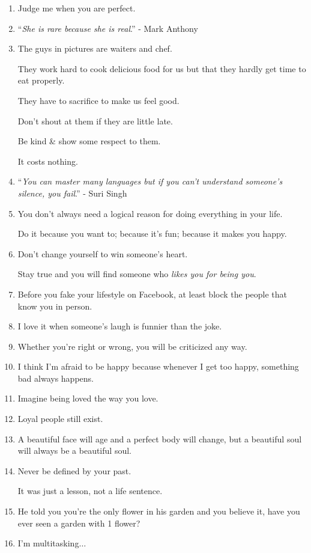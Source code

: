\documentclass{article}
\numberwithin{equation}{section}
\begin{document}
\begin{enumerate}
    Just lessons learned.
    \item Judge me when you are perfect.
    \item ``\textit{She is rare because she is real}.'' - Mark Anthony
    \item The guys in pictures are waiters and chef.
    
    They work hard to cook delicious food for us but that they hardly get time to eat properly.
    
    They have to sacrifice to make us feel good.
    
    Don't shout at them if they are little late.
    
    Be kind \& show some respect to them.
    
    It costs nothing.
    \item ``\textit{You can master many languages but if you can't understand someone's silence, you fail}.'' - Suri Singh
    \item You don't always need a logical reason for doing everything in your life.
    
    Do it because you want to; because it's fun; because it makes you happy.
    \item Don't change yourself to win someone's heart.
    
    Stay true and you will find someone who \textit{likes you for being you}.
    \item Before you fake your lifestyle on Facebook, at least block the people that know you in person.
    \item I love it when someone's laugh is funnier than the joke.
    \item Whether you're right or wrong, you will be criticized any way.
    \item I think I'm afraid to be happy because whenever I get too happy, something bad always happens.
    \item Imagine being loved the way you love.
    \item Loyal people still exist.
    \item A beautiful face will age and a perfect body will change, but a beautiful soul will always be a beautiful soul.
    \item Never be defined by your past.
    
    It was just a lesson, not a life sentence.
    \item He told you you're the only flower in his garden and you believe it, have you ever seen a garden with 1 flower?
    \item I'm multitasking$\ldots$
    

\end{enumerate}
\end{document}
